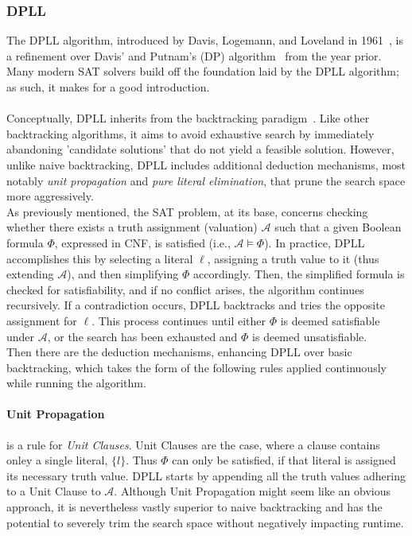 \subsubsection{DPLL}
The DPLL algorithm, introduced by Davis, Logemann, and Loveland in 1961~\cite{Original-DPLL-Article}, is a refinement over Davis' and Putnam's (DP) algorithm~\cite{Original-DP-Article} from the year prior. Many modern SAT solvers build off the foundation laid by the DPLL algorithm; as such, it makes for a good introduction.
\\
\\
Conceptually, DPLL inherits from the backtracking paradigm~\cite{Wiki-backtracking}. Like other backtracking algorithms, it aims to avoid exhaustive search by immediately abandoning  'candidate solutions' that do not yield a feasible solution. However, unlike naive backtracking, DPLL includes additional deduction mechanisms, most notably \emph{unit propagation} and \emph{pure literal elimination}, that prune the search space more aggressively.
\\
As previously mentioned, the SAT problem, at its base, concerns checking whether there exists a truth assignment (valuation) \(\mathcal{A}\) such that a given Boolean formula \(\Phi\), expressed in CNF, is satisfied (i.e., \(\mathcal{A} \models \Phi\)). In practice, DPLL accomplishes this by selecting a literal \(\ell\), assigning a truth value to it (thus extending \(\mathcal{A}\)), and then simplifying \(\Phi\) accordingly. Then, the simplified formula is checked for satisfiability, and if no conflict arises, the algorithm continues recursively. If a contradiction occurs, DPLL backtracks and tries the opposite assignment for \(\ell\). This process continues until either \(\Phi\) is deemed satisfiable under \(\mathcal{A}\), or the search has been exhausted and \(\Phi\) is deemed unsatisfiable.
\\
Then there are the deduction mechanisms, enhancing DPLL over basic backtracking, which takes the form of the following rules applied continuously while running the algorithm.

\paragraph{Unit Propagation} is a rule for \emph{Unit Clauses}. Unit Clauses are the case, where a clause contains onley a single literal, \(\{l\}\). Thus \(\Phi\) can only be satisfied, if that literal is assigned its necessary truth value. DPLL starts by appending all the truth values adhering to a Unit Clause to \(\mathcal{A}\). Although Unit Propagation might seem like an obvious approach, it is nevertheless vastly superior to naive backtracking and has the potential to severely trim the search space without negatively impacting runtime.

